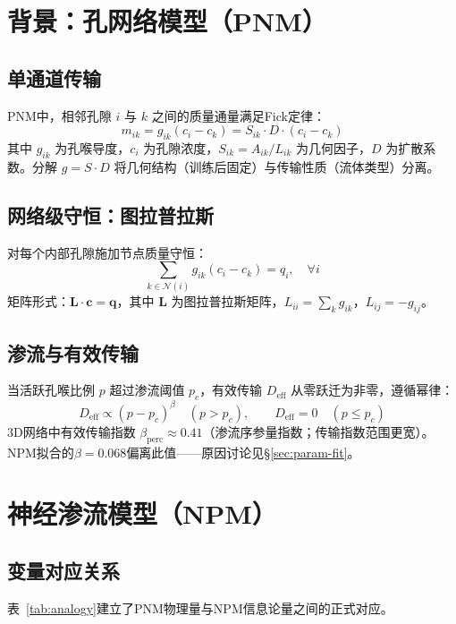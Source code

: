 \documentclass[11pt,a4paper]{article}
\newcommand{\Deff}{D_{\text{eff}}}
\begin{document}
\section{背景：孔网络模型（PNM）}

\subsection{单通道传输}
PNM中，相邻孔隙 $i$ 与 $k$ 之间的质量通量满足Fick定律：
\begin{equation}
  m_{ik} = g_{ik}(c_i - c_k) = S_{ik} \cdot D \cdot (c_i - c_k)
\end{equation}
其中 $g_{ik}$ 为孔喉导度，$c_i$ 为孔隙浓度，$S_{ik}=A_{ik}/L_{ik}$ 为几何因子，$D$ 为扩散系数。分解 $g=S\cdot D$ 将几何结构（训练后固定）与传输性质（流体类型）分离。

\subsection{网络级守恒：图拉普拉斯}
对每个内部孔隙施加节点质量守恒：
\begin{equation}
  \sum_{k\in\mathcal{N}(i)} g_{ik}(c_i-c_k)=q_i, \quad \forall i
\end{equation}
矩阵形式：$\mathbf{L}\cdot\mathbf{c}=\mathbf{q}$，其中 $\mathbf{L}$ 为图拉普拉斯矩阵，$L_{ii}=\sum_k g_{ik}$，$L_{ij}=-g_{ij}$。

\subsection{渗流与有效传输}
当活跃孔喉比例 $p$ 超过渗流阈值 $p_c$，有效传输 $\Deff$ 从零跃迁为非零，遵循幂律：
\begin{equation}
  \Deff \propto (p-p_c)^\beta \quad (p>p_c), \qquad \Deff=0 \quad (p \le p_c)
\end{equation}
3D网络中有效传输指数 $\beta_{\text{perc}} \approx 0.41$（渗流序参量指数；传输指数范围更宽）。NPM拟合的$\beta=0.068$偏离此值——原因讨论见\S\ref{sec:param-fit}。

\section{神经渗流模型（NPM）}

\subsection{变量对应关系}
表~\ref{tab:analogy}建立了PNM物理量与NPM信息论量之间的正式对应。
\end{document}
